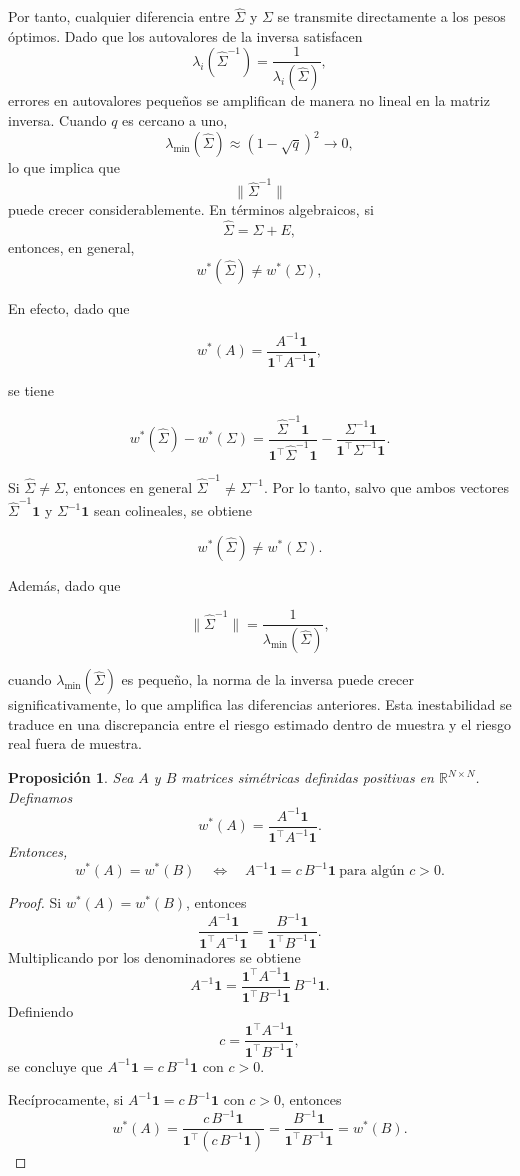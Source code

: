 \documentclass[letterpaper,12pt,oneside]{book}
\newtheorem{proposition}{Proposición}[section]
\begin{document}
Por tanto, cualquier diferencia entre $\widehat{\Sigma}$ y $\Sigma$ se transmite directamente a los pesos óptimos.
Dado que los autovalores de la inversa satisfacen
\[
\lambda_i(\widehat{\Sigma}^{-1})
=
\frac{1}{\lambda_i(\widehat{\Sigma})},
\]
errores en autovalores pequeños se amplifican de manera no lineal en la matriz inversa. Cuando $q$ es cercano a uno,
\[
\lambda_{\min}(\widehat{\Sigma})
\approx (1-\sqrt{q})^2 \to 0,
\]
lo que implica que
\[
\|\widehat{\Sigma}^{-1}\|
\]
puede crecer considerablemente.
En términos algebraicos, si
\[
\widehat{\Sigma} = \Sigma + E,
\]
entonces, en general,
\[
w^*(\widehat{\Sigma})
\neq
w^*(\Sigma),
\]

En efecto, dado que

\[
w^*(A)=\frac{A^{-1}\mathbf{1}}{\mathbf{1}^\top A^{-1}\mathbf{1}},
\]

se tiene

\[
w^*(\widehat{\Sigma})
-
w^*(\Sigma)
=
\frac{\widehat{\Sigma}^{-1}\mathbf{1}}{\mathbf{1}^\top \widehat{\Sigma}^{-1}\mathbf{1}}
-
\frac{\Sigma^{-1}\mathbf{1}}{\mathbf{1}^\top \Sigma^{-1}\mathbf{1}}.
\]

Si $\widehat{\Sigma} \neq \Sigma$, entonces en general
$\widehat{\Sigma}^{-1} \neq \Sigma^{-1}$.
Por lo tanto, salvo que ambos vectores
$\widehat{\Sigma}^{-1}\mathbf{1}$ y $\Sigma^{-1}\mathbf{1}$
sean colineales, se obtiene

\[
w^*(\widehat{\Sigma})
\neq
w^*(\Sigma).
\]

Además, dado que

\[
\|\widehat{\Sigma}^{-1}\|
=
\frac{1}{\lambda_{\min}(\widehat{\Sigma})},
\]

cuando $\lambda_{\min}(\widehat{\Sigma})$ es pequeño, la norma de la inversa puede crecer significativamente,
lo que amplifica las diferencias anteriores.
Esta inestabilidad se traduce en una discrepancia entre el riesgo estimado dentro de muestra y el riesgo real fuera de muestra.

\begin{proposition}
Sea $A$ y $B$ matrices simétricas definidas positivas en $\mathbb{R}^{N\times N}$.
Definamos
\[
w^*(A)=\frac{A^{-1}\mathbf{1}}{\mathbf{1}^\top A^{-1}\mathbf{1}}.
\]
Entonces,
\[
w^*(A)=w^*(B)
\quad \Longleftrightarrow \quad
A^{-1}\mathbf{1} = c\, B^{-1}\mathbf{1}
\ \text{para algún } c>0.
\]
\end{proposition}

\begin{proof}
Si $w^*(A)=w^*(B)$, entonces
\[
\frac{A^{-1}\mathbf{1}}{\mathbf{1}^\top A^{-1}\mathbf{1}}
=
\frac{B^{-1}\mathbf{1}}{\mathbf{1}^\top B^{-1}\mathbf{1}}.
\]
Multiplicando por los denominadores se obtiene
\[
A^{-1}\mathbf{1}
=
\frac{\mathbf{1}^\top A^{-1}\mathbf{1}}
{\mathbf{1}^\top B^{-1}\mathbf{1}}
\, B^{-1}\mathbf{1}.
\]
Definiendo
\[
c=
\frac{\mathbf{1}^\top A^{-1}\mathbf{1}}
{\mathbf{1}^\top B^{-1}\mathbf{1}},
\]
se concluye que $A^{-1}\mathbf{1}=c\,B^{-1}\mathbf{1}$ con $c>0$.

Recíprocamente, si $A^{-1}\mathbf{1}=c\,B^{-1}\mathbf{1}$ con $c>0$,
entonces
\[
w^*(A)
=
\frac{c\,B^{-1}\mathbf{1}}
{\mathbf{1}^\top (c\,B^{-1}\mathbf{1})}
=
\frac{B^{-1}\mathbf{1}}
{\mathbf{1}^\top B^{-1}\mathbf{1}}
=
w^*(B).
\]
\end{proof}
\end{document}

